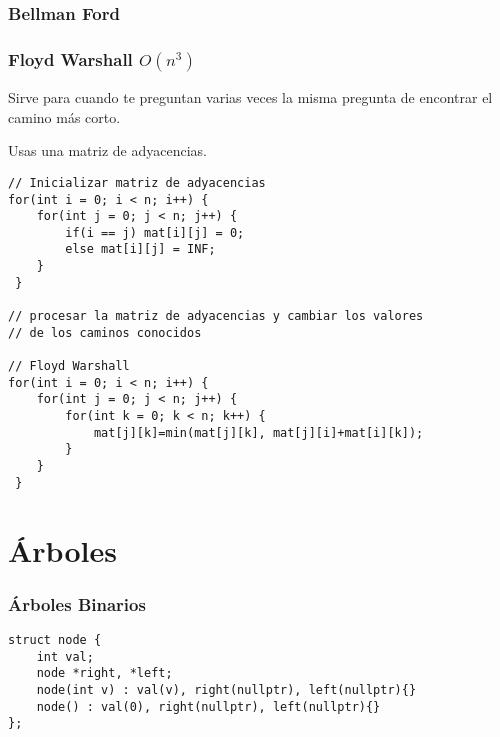 \documentclass[11pt]{article}
\begin{document}
\subsubsection{Bellman Ford}
\label{sec:org8bdc4bc}

\subsubsection{Floyd Warshall \(O(n^3)\)}
\label{sec:org8c8834f}

Sirve para cuando te preguntan varias veces la misma pregunta
de encontrar el camino más corto.

Usas una matriz de adyacencias.

\lstset{language=C++,label= ,caption= ,captionpos=b,numbers=none}
\begin{lstlisting}
// Inicializar matriz de adyacencias
for(int i = 0; i < n; i++) {
	for(int j = 0; j < n; j++) {
		if(i == j) mat[i][j] = 0;
		else mat[i][j] = INF;
	}
 }

// procesar la matriz de adyacencias y cambiar los valores
// de los caminos conocidos

// Floyd Warshall
for(int i = 0; i < n; i++) {
	for(int j = 0; j < n; j++) {
		for(int k = 0; k < n; k++) {
			mat[j][k]=min(mat[j][k], mat[j][i]+mat[i][k]);
		}
	}
 }
\end{lstlisting}

\section{Árboles}
\label{sec:org7b242bd}

\subsubsection{Árboles Binarios}
\label{sec:org3f81275}

\lstset{language=C++,label= ,caption= ,captionpos=b,numbers=none}
\begin{lstlisting}
struct node {
	int val;
	node *right, *left;
	node(int v) : val(v), right(nullptr), left(nullptr){}
	node() : val(0), right(nullptr), left(nullptr){}
};
\end{lstlisting}
\end{document}
